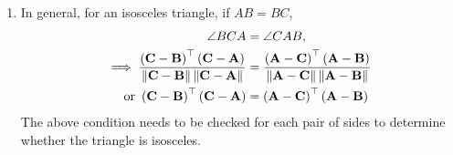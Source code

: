 \documentclass[journal,12pt,twocolumn]{IEEEtran}
\renewcommand\thesection{\arabic{section}}
\begin{document}
\begin{enumerate}[label=\thesection.\arabic*.,ref=\thesection.\theenumi]
\begin{enumerate}
	\item In general,  for an isosceles triangle, if $AB = BC$,
		\begin{align}
			\angle BCA &= 
			\angle CAB,  
			\\
			\implies \frac{\left(\mathbf{C}-\mathbf{B}\right)^{\top}\left(\mathbf{C}-\mathbf{A}\right)}{\left\lVert\mathbf{C}-\mathbf{B}\right\rVert\left\lVert\mathbf{C}-\mathbf{A}\right\rVert}
			&=\frac{\left(\mathbf{A}-\mathbf{C}\right)^{\top}\left(\mathbf{A}-\mathbf{B}\right)}{\left\lVert\mathbf{A}-\mathbf{C}\right\rVert\left\lVert\mathbf{A}-\mathbf{B}\right\rVert}
			\\
			\text{or }\left(\mathbf{C}-\mathbf{B}\right)^{\top}\left(\mathbf{C}-\mathbf{A}\right) &= \left(\mathbf{A}-\mathbf{C}\right)^{\top}\left(\mathbf{A}-\mathbf{B}\right)
		\end{align}
		The above condition needs to be checked for each pair of sides to determine whether the triangle is isosceles.
		\end{enumerate}
\end{enumerate}
\end{document}
